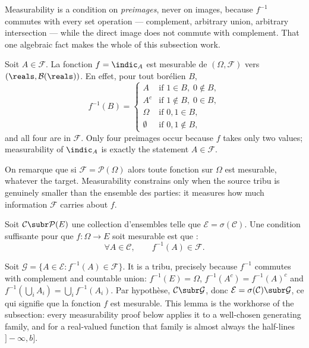 \medskip
Measurability is a condition on \emph{preimages}, never on images, because $f^{-1}$
commutes with every set operation --- complement, arbitrary union, arbitrary
intersection --- while the direct image does not commute with complement. That one
algebraic fact makes the whole of this subsection work.

\begin{example}
  Soit $A \in \mathcal{F}$. La fonction $f = \indic_{A}$ est mesurable de
  $(\Omega,\mathcal{F})$ vers $(\reals,\mathcal{B}(\reals))$. En effet, pour tout
  borélien $B$,
  \[
    f^{-1}(B) =
    \begin{cases}
      A & \text{if } 1 \in B, \; 0 \notin B,\\
      A^{c} & \text{if } 1 \notin B, \; 0 \in B,\\
      \Omega & \text{if } 0, 1 \in B,\\
      \emptyset & \text{if } 0, 1 \notin B,
    \end{cases}
  \]
  and all four are in $\mathcal{F}$. Only four preimages occur because $f$ takes only
  two values; measurability of $\indic_{A}$ is exactly the statement $A \in
  \mathcal{F}$.
\end{example}

\begin{remark}
  On remarque que si $\mathcal{F} = \mathcal{P}(\Omega)$ alors toute fonction sur
  $\Omega$ est mesurable, whatever the target. Measurability constrains only when the
  source tribu is genuinely smaller than the ensemble des parties: it measures how
  much information $\mathcal{F}$ carries about $f$.
\end{remark}

\begin{lemma}
  Soit $\mathcal{C} \subr \mathcal{P}(E)$ une collection d'ensembles telle que
  $\mathcal{E} = \sigma(\mathcal{C})$. Une condition suffisante pour que $f : \Omega
  \to E$ soit mesurable est que :
  \[
    \forall A \in \mathcal{C}, \qquad f^{-1}(A) \in \mathcal{F}.
  \]
\end{lemma}

\begin{remark}
  Soit $\mathcal{G} = \{A \in \mathcal{E} : f^{-1}(A) \in \mathcal{F}\}$. It is a
  tribu, precisely because $f^{-1}$ commutes with complement and countable union:
  $f^{-1}(E) = \Omega$, $f^{-1}(A^{c}) = f^{-1}(A)^{c}$ and $f^{-1}(\bigcup_{i}
  A_{i}) = \bigcup_{i} f^{-1}(A_{i})$. Par hypothèse, $\mathcal{C} \subr
  \mathcal{G}$, donc $\mathcal{E} = \sigma(\mathcal{C}) \subr \mathcal{G}$, ce qui
  signifie que la fonction $f$ est mesurable. This lemma is the workhorse of the
  subsection: every measurability proof below applies it to a well-chosen generating
  family, and for a real-valued function that family is almost always the half-lines
  $]-\infty,b]$.
\end{remark}

